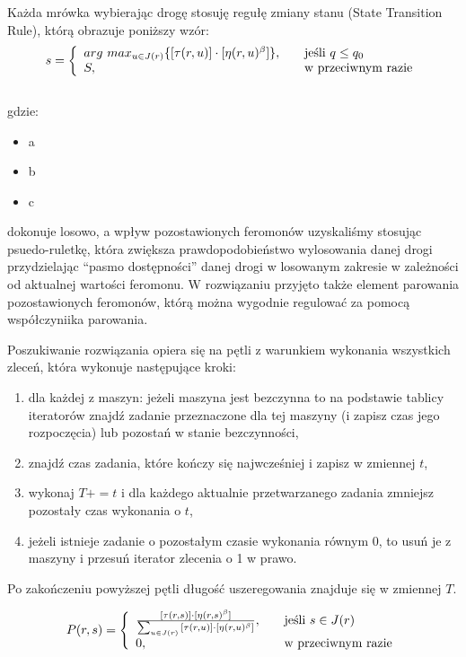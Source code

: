 \documentclass[10pt,a4paper]{article}
\begin{document}
Każda mrówka wybierając drogę stosuję regułę zmiany stanu (State Transition Rule), którą obrazuje poniższy wzór:\\
\begin{equation}
 s = \left\{ 
  \begin{array}{l l}
    arg\ max_{u \in J(r)} \{ [\tau (r,u)] \cdot [\eta (r,u)^\beta] \} , & \quad \text{jeśli $q\leq q_0$}\\
    S, & \quad \text{w przeciwnym razie}
  \end{array} \right.
\end{equation} \\
gdzie:
\begin{itemize}
  \item a  
  \item b
  \item c
\end{itemize}



dokonuje losowo, a wpływ pozostawionych feromonów uzyskaliśmy stosując
psuedo-ruletkę, która zwiększa prawdopodobieństwo wylosowania danej drogi
przydzielając “pasmo dostępności” danej drogi w losowanym zakresie w zależności
od aktualnej wartości feromonu.  W rozwiązaniu przyjęto także element parowania
pozostawionych feromonów, którą można wygodnie regulować za pomocą współczyniika
parowania.

Poszukiwanie rozwiązania opiera się na pętli z warunkiem wykonania wszystkich
zleceń, która wykonuje następujące kroki:
\begin{enumerate}
    \item dla każdej z maszyn: jeżeli maszyna jest bezczynna to na podstawie
      tablicy iteratorów znajdź zadanie przeznaczone dla tej maszyny (i zapisz
      czas jego rozpoczęcia) lub pozostań w stanie bezczynności,
    \item znajdź czas zadania, które kończy się najwcześniej i zapisz w zmiennej
      $t$,
    \item wykonaj $T += t$ i dla każdego aktualnie przetwarzanego zadania
      zmniejsz pozostały czas wykonania o $t$,
    \item jeżeli istnieje zadanie o pozostałym czasie wykonania równym 0, to
      usuń je z maszyny i przesuń iterator zlecenia o 1 w prawo.
\end{enumerate}

Po zakończeniu powyższej pętli długość uszeregowania znajduje się w zmiennej
$T$. 




\begin{equation}
 P(r,s) = \left\{ 
  \begin{array}{l l}
    \frac{[\tau (r,s)] \cdot [\eta (r,s)^\beta]}{\sum_{u \in J(r)} {[\tau (r,u)]
    \cdot [\eta (r,u)^\beta]}},
    & \quad \text{jeśli }s \in J(r)\\
     0, & \quad \text{w przeciwnym razie}
  \end{array} \right.
\end{equation}
\end{document}
